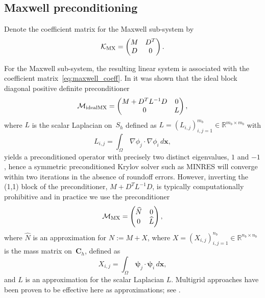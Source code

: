 \documentclass{siamltex}
\newcommand{\uu}[1]{\boldsymbol #1}                     %
\begin{document}
\subsection{Maxwell preconditioning}

Denote the coefficient matrix for the Maxwell sub-system by
\begin{equation}
\label{eq:maxwell_coeff}
\mathcal{K}_{\rm MX}=
\begin{pmatrix}
M & D^T \\
D & 0
\end{pmatrix}.
\end{equation}

For the Maxwell sub-system, the resulting linear system is associated with the coefficient matrix~\eqref{eq:maxwell_coeff}.
In \cite{Greif07} it was shown that the ideal block diagonal positive definite preconditioner
\begin{equation}
\label{eq:maxwell_pc_ideal}
\mathcal{M}_{\rm idealMX} =
\begin{pmatrix}
M+D^T L^{-1} D & 0 \\
0 & L
\end{pmatrix},
\end{equation}
where $L$ is the scalar Laplacian on~$S_h$ defined as
$L=(L_{i,j})_{i,j=1}^{m_b} \in{\mathbb R}^{m_b \times m_b}$ with
\begin{equation}
\label{eq:scalar_laplace}
L_{i,j}=\int_\Omega\,\nabla\phi_j\cdot\nabla\phi_i\,d\uu{x},
\end{equation}
yields a preconditioned operator with precisely two distinct eigenvalues, $1$ and $-1$, hence a symmetric preconditioned Krylov solver such as MINRES will converge within two iterations in the absence of roundoff errors. However, inverting the (1,1) block of the preconditioner, $M+D^T L^{-1} D$, is typically computationally prohibitive and in practice we use the preconditioner
\begin{equation}
\label{eq:maxwell_pc}
\mathcal{M}_{\rm MX} =
\begin{pmatrix}
\widehat{N} & 0 \\
0 & \widehat{L}
\end{pmatrix},
\end{equation}
where  $\widehat{N}$ is an approximation for $N:=M+X$, where $X=(X_{i,j})_{i,j=1}^{n_b}\in{\mathbb R}^{n_b \times n_b}$ is the
mass matrix on~$\uu{C}_h$, defined as
\begin{equation}
\label{eq:magnetic_mass}
X_{i,j}=\int_\Omega\, \uu{\psi}_j\cdot\uu{\psi}_i\,d\uu{x},
\end{equation}
and $\widehat{L}$ is an approximation for the scalar Laplacian $L$. Multigrid approaches have been proven to be effective here as approximations; see \cite{XX,XX,XX}.
\end{document}
